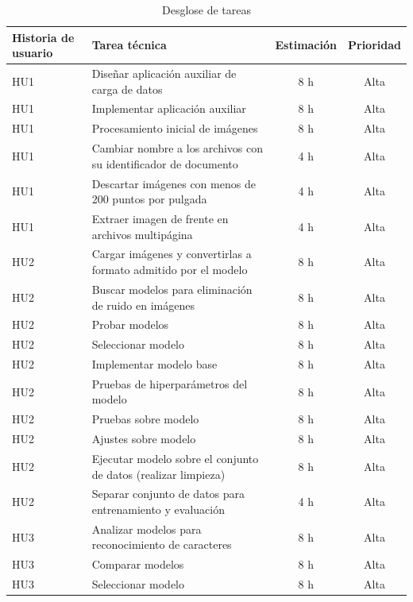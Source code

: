 \documentclass[
11pt, %
]{charter}
\begin{document}
\begin{table}[H]
\caption{Desglose de tareas}
\centering
\begin{tabularx}{\linewidth}{@{}|l|X|c|c|@{}}
\hline
\rowcolor[HTML]{C0C0C0}
Historia de usuario & Tarea técnica & Estimación & Prioridad \\ \hline
HU1 & Diseñar aplicación auxiliar de carga de datos & 8 h & Alta \\ \hline
HU1 & Implementar aplicación auxiliar & 8 h & Alta \\ \hline
HU1 & Procesamiento inicial de imágenes & 8 h & Alta \\ \hline
HU1 & Cambiar nombre a los archivos con su identificador de documento & 4 h & Alta \\ \hline
HU1 & Descartar imágenes con menos de 200 puntos por pulgada & 4 h & Alta \\ \hline
HU1 & Extraer imagen de frente en archivos multipágina & 4 h & Alta \\ \hline

HU2 & Cargar imágenes y convertirlas a formato admitido por el modelo & 8 h & Alta \\ \hline
HU2 & Buscar modelos para eliminación de ruido en imágenes & 8 h & Alta \\ \hline
HU2 & Probar modelos & 8 h & Alta \\ \hline
HU2 & Seleccionar modelo & 8 h & Alta \\ \hline

HU2 & Implementar modelo base & 8 h & Alta \\ \hline
HU2 & Pruebas de hiperparámetros del modelo & 8 h & Alta \\ \hline
HU2 & Pruebas sobre modelo & 8 h & Alta \\ \hline
HU2 & Ajustes sobre modelo & 8 h & Alta \\ \hline

HU2 & Ejecutar modelo sobre el conjunto de datos (realizar limpieza) & 8 h & Alta \\ \hline
HU2 & Separar conjunto de datos para entrenamiento y evaluación & 4 h & Alta \\ \hline

HU3 & Analizar modelos para reconocimiento de caracteres & 8 h & Alta \\ \hline
HU3 & Comparar modelos & 8 h & Alta \\ \hline
HU3 & Seleccionar modelo & 8 h & Alta \\ \hline


\end{tabularx}
\end{table}
\end{document}
